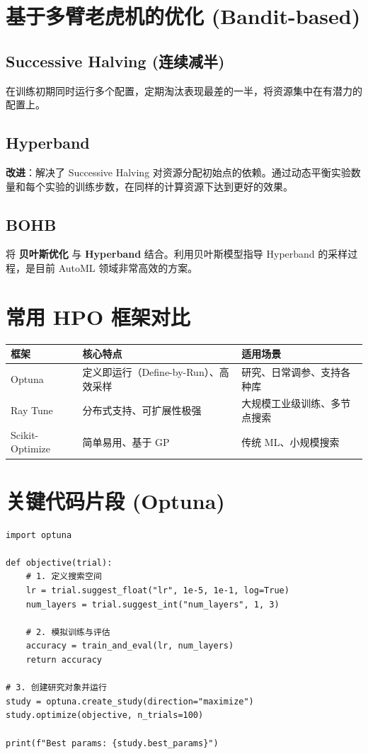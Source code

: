\documentclass[12pt, a4paper]{article}
\begin{document}
\section{基于多臂老虎机的优化 (Bandit-based)}

\subsection{Successive Halving (连续减半)}
在训练初期同时运行多个配置，定期淘汰表现最差的一半，将资源集中在有潜力的配置上。

\subsection{Hyperband}
\textbf{改进}：解决了 Successive Halving 对资源分配初始点的依赖。通过动态平衡实验数量和每个实验的训练步数，在同样的计算资源下达到更好的效果。

\subsection{BOHB}
将 \textbf{贝叶斯优化} 与 \textbf{Hyperband} 结合。利用贝叶斯模型指导 Hyperband 的采样过程，是目前 AutoML 领域非常高效的方案。

\section{常用 HPO 框架对比}
\begin{table}[h]
\centering
\begin{tabularx}{\textwidth}{|l|X|X|}
\hline
\textbf{框架} & \textbf{核心特点} & \textbf{适用场景} \\
\hline
Optuna & 定义即运行（Define-by-Run）、高效采样 & 研究、日常调参、支持各种库 \\
\hline
Ray Tune & 分布式支持、可扩展性极强 & 大规模工业级训练、多节点搜索 \\
\hline
Scikit-Optimize & 简单易用、基于 GP & 传统 ML、小规模搜索 \\
\hline
\end{tabularx}
\end{table}

\section{关键代码片段 (Optuna)}
\begin{lstlisting}
import optuna

def objective(trial):
    # 1. 定义搜索空间
    lr = trial.suggest_float("lr", 1e-5, 1e-1, log=True)
    num_layers = trial.suggest_int("num_layers", 1, 3)
    
    # 2. 模拟训练与评估
    accuracy = train_and_eval(lr, num_layers)
    return accuracy

# 3. 创建研究对象并运行
study = optuna.create_study(direction="maximize")
study.optimize(objective, n_trials=100)

print(f"Best params: {study.best_params}")
\end{lstlisting}
\end{document}
